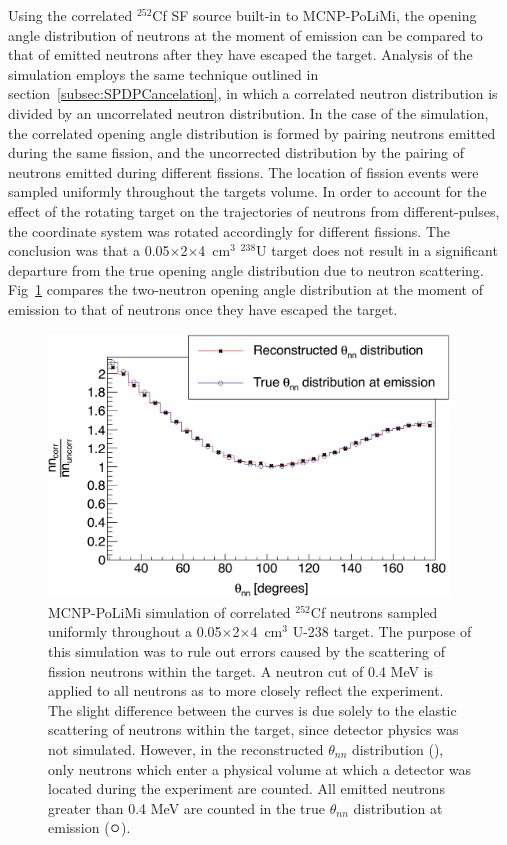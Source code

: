 Using the correlated $^{252}$Cf SF source built-in to MCNP-PoLiMi, the opening angle distribution of neutrons at the moment of emission can be compared to that of emitted neutrons after they have escaped the target.
Analysis of the simulation employs the same technique outlined in section~\ref{subsec:SPDPCancelation}, in which a correlated neutron distribution is divided by an uncorrelated neutron distribution.
In the case of the simulation, the correlated opening angle distribution is formed by pairing neutrons emitted during the same fission, and the uncorrected distribution by the pairing of neutrons emitted during different fissions.
The location of fission events were sampled uniformly throughout the targets volume.
In order to account for the effect of the rotating target on the trajectories of neutrons from different-pulses, the coordinate system was rotated accordingly for different fissions.
The conclusion was that a 0.05$\times$2$\times$4~cm$^3$ $^{238}$U target does not result in a significant departure from the true opening angle distribution due to neutron scattering.
Fig~\ref{fig:ElasticScatteringEffect} compares the two-neutron opening angle distribution at the moment of emission to that of neutrons once they have escaped the target.
\begin{figure}
    \centering
    \includegraphics[width = 0.95\textwidth]{Content/Errors/EffectOfElasticScattering.png}
    \caption{MCNP-PoLiMi simulation of correlated $^{252}$Cf neutrons sampled uniformly throughout a 0.05$\times$2$\times$4~cm$^3$ U-238 target.
    The purpose of this simulation was to rule out errors caused by the scattering of fission neutrons within the target.
    A neutron cut of 0.4 MeV is applied to all neutrons as to more closely reflect the experiment.
    The slight difference between the curves is due solely to the elastic scattering of neutrons within the target, since detector physics was not simulated.
    However, in the reconstructed $\theta_{nn}$ distribution ({\tiny {}}), only neutrons which enter a physical volume at which a detector was located during the experiment are counted.
    All emitted neutrons greater than 0.4 MeV are counted in the true $\theta_{nn}$ distribution at emission ($\mathlarger{\mathlarger{\mathlarger{\circ}}}$).
    }
    \label{fig:ElasticScatteringEffect}
\end{figure}


